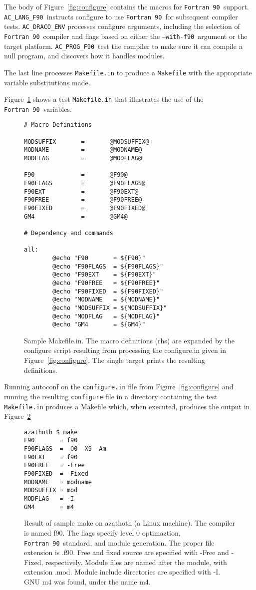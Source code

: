 \documentclass[11pt]{nmemo}
\newcommand{\fninety}{\texttt{Fortran~90}}
\newcommand{\withfninety}{\texttt{--with-f90}}
\newcommand{\langfninety}{\texttt{AC\_LANG\_F90}}
\newcommand{\progfninety}{\texttt{AC\_PROG\_F90}}
\begin{document}
The body of Figure~\ref{fig:configure} contains the macros for
\fninety\ support.  \langfninety\ instructs configure to use \fninety\
for subsequent compiler tests.  \texttt{AC\_DRACO\_ENV} processes
configure arguments, including the selection of \fninety\ compiler and
flags based on either the \withfninety\ argument or the target
platform.  \progfninety\ test the compiler to make sure it can compile
a null program, and discovers how it handles modules.

The last line processes \texttt{Makefile.in} to produce a
\texttt{Makefile} with the appropriate variable substitutions made.

Figure~\ref{fig:makefile} shows a test \texttt{Makefile.in} that
illustrates the use of the \fninety\ variables.  
\begin{figure}[hbt]
\begin{verbatim}
# Macro Definitions

MODSUFFIX       =       @MODSUFFIX@
MODNAME         =       @MODNAME@
MODFLAG         =       @MODFLAG@

F90             =       @F90@
F90FLAGS        =       @F90FLAGS@
F90EXT          =       @F90EXT@
F90FREE         =       @F90FREE@
F90FIXED        =       @F90FIXED@
GM4             =       @GM4@

# Dependency and commands

all:
        @echo "F90       = ${F90}"
        @echo "F90FLAGS  = ${F90FLAGS}"
        @echo "F90EXT    = ${F90EXT}"
        @echo "F90FREE   = ${F90FREE}"
        @echo "F90FIXED  = ${F90FIXED}"
        @echo "MODNAME   = ${MODNAME}"
        @echo "MODSUFFIX = ${MODSUFFIX}"
        @echo "MODFLAG   = ${MODFLAG}"
        @echo "GM4       = ${GM4}"
\end{verbatim}%
\caption{Sample Makefile.in.  The macro definitions (rhs) are expanded
by the configure script resulting from processing the configure.in
given in Figure~\ref{fig:configure}.  The single target prints the resulting
definitions.}\label{fig:makefile}
\end{figure}

Running autoconf on the \texttt{configure.in} file from
Figure~\ref{fig:configure} and running the resulting
\texttt{configure} file in a directory containing the test
\texttt{Makefile.in} produces a {Makefile} which, when executed,
produces the output in Figure~\ref{fig:make}
\begin{figure}[hbt]
\begin{verbatim}
azathoth $ make
F90       = f90
F90FLAGS  = -O0 -X9 -Am
F90EXT    = f90
F90FREE   = -Free
F90FIXED  = -Fixed
MODNAME   = modname
MODSUFFIX = mod
MODFLAG   = -I
GM4       = m4
\end{verbatim}%
\caption{Result of sample make on azathoth (a Linux
machine).  The compiler is named f90.  The flags specify level 0
optimaztion, \fninety\ standard, and module generation.  The proper
file extension is .f90.  Free and fixed source are specified with
-Free and -Fixed, respectively.  Module files are named after the
module, with extension .mod.  Module include directories are specified
with -I.  GNU m4 was found, under the name m4.}\label{fig:make}
\end{figure}
\end{document}

